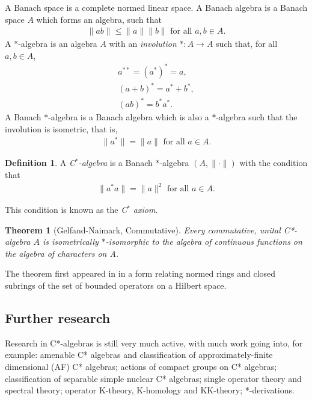\documentclass[12pt,a4paper]{amsart}
\theoremstyle{plain}
\newtheorem*{thm*}{Theorem}
\theoremstyle{definition}
\newtheorem*{defn*}{Definition}
\begin{document}
A Banach space is a complete normed linear space. 
A Banach algebra is a Banach space $A$ which forms an algebra, such that 
\begin{align*}
	\|ab\| \leq \|a\| \|b\| \mbox{ for all } a,b \in A.
\end{align*}
A $\ast$-algebra is an algebra $A$ with an \emph{involution} $\ast : A \to A $ such that, for all $a,b \in A$,
\begin{align*}
	 a^{\ast\ast} = (a^\ast)^\ast = a,\\
	(a+b)^\ast = a^\ast + b^\ast,\\	
	(ab)^\ast = b^\ast a^\ast.
\end{align*}
A Banach $\ast$-algebra is a Banach algebra which is also a $\ast$-algebra such that the involution is isometric, that is,
\begin{align*}
	\|a ^\ast \| = \|a\| \mbox{ for all } a \in A.
\end{align*}


\begin{defn*}
A \emph{C$^\ast$-algebra} is a Banach $\ast$-algebra $(A, \| \cdot \|)$ with the condition that
\begin{align*}
	\|a ^\ast a\| = \|a\|^2 \mbox{ for all } a \in A.
\end{align*}
\end{defn*}
\noindent This condition is known as the \emph{C$^\ast$ axiom}. 


\begin{thm*}[Gelfand-Naimark, Commutative]
	Every commutative, unital C*-algebra $A$ is isometrically $\ast$-isomorphic to the algebra of continuous functions on the algebra of characters on A.

\end{thm*}
The theorem first appeared in \cite{gelfand43} in a form relating normed rings and closed subrings of the set of bounded operators on a Hilbert space.



\subsection{Further research}
	Research in C*-algebras is still very much active, with much work going into, for example: 
	amenable C* algebras and classification of approximately-finite dimensional (AF) C* algebras; 
	actions of compact groups on C* algebras; 
	classification of separable simple nuclear C* algebras; 
	single operator theory and spectral theory; 
	operator K-theory, K-homology and KK-theory; 
	*-derivations.
	
\end{document}
